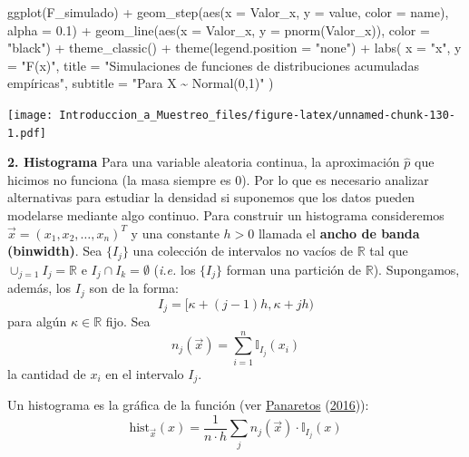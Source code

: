 \documentclass[
]{book}
\newenvironment{Shaded}{\begin{snugshade}}{\end{snugshade}}
\newcommand{\AttributeTok}[1]{\textcolor[rgb]{0.77,0.63,0.00}{#1}}
\newcommand{\FloatTok}[1]{\textcolor[rgb]{0.00,0.00,0.81}{#1}}
\newcommand{\FunctionTok}[1]{\textcolor[rgb]{0.00,0.00,0.00}{#1}}
\newcommand{\NormalTok}[1]{#1}
\newcommand{\SpecialCharTok}[1]{\textcolor[rgb]{0.00,0.00,0.00}{#1}}
\newcommand{\StringTok}[1]{\textcolor[rgb]{0.31,0.60,0.02}{#1}}
\begin{document}
\begin{Shaded}
\begin{Highlighting}[]
\FunctionTok{ggplot}\NormalTok{(F\_simulado) }\SpecialCharTok{+}
  \FunctionTok{geom\_step}\NormalTok{(}\FunctionTok{aes}\NormalTok{(}\AttributeTok{x =}\NormalTok{ Valor\_x, }\AttributeTok{y =}\NormalTok{ value, }\AttributeTok{color =}\NormalTok{ name), }\AttributeTok{alpha =} \FloatTok{0.1}\NormalTok{) }\SpecialCharTok{+}
  \FunctionTok{geom\_line}\NormalTok{(}\FunctionTok{aes}\NormalTok{(}\AttributeTok{x =}\NormalTok{ Valor\_x, }\AttributeTok{y =} \FunctionTok{pnorm}\NormalTok{(Valor\_x)), }\AttributeTok{color =} \StringTok{"black"}\NormalTok{) }\SpecialCharTok{+}
  \FunctionTok{theme\_classic}\NormalTok{() }\SpecialCharTok{+}
  \FunctionTok{theme}\NormalTok{(}\AttributeTok{legend.position =} \StringTok{"none"}\NormalTok{) }\SpecialCharTok{+}
  \FunctionTok{labs}\NormalTok{(}
    \AttributeTok{x =} \StringTok{"x"}\NormalTok{,}
    \AttributeTok{y =} \StringTok{"F(x)"}\NormalTok{,}
    \AttributeTok{title =} \StringTok{"Simulaciones de funciones de distribuciones acumuladas empíricas"}\NormalTok{,}
    \AttributeTok{subtitle =} \StringTok{"Para X \textasciitilde{} Normal(0,1)"}
\NormalTok{  )}
\end{Highlighting}
\end{Shaded}

\texttt{[image: Introduccion\_a\_Muestreo\_files/figure-latex/unnamed-chunk-130-1.pdf]}

\textbf{2. Histograma}
Para una variable aleatoria continua, la aproximación \(\hat{p}\) que hicimos no funciona (la masa siempre es \(0\)). Por lo que es necesario analizar alternativas para estudiar la densidad si suponemos que los datos pueden modelarse mediante algo continuo. Para construir un histograma consideremos \(\vec{x} = (x_1, x_2, \dots, x_n)^T\) y una constante \(h > 0\) llamada el \textbf{ancho de banda (binwidth)}. Sea \(\{ I_j \}\) una colección de intervalos no vacíos de \(\mathbb{R}\) tal que \(\cup_{j=1} I_j = \mathbb{R}\) e \(I_j \cap I_k = \emptyset\) (\emph{i.e.} los \(\{ I_j \}\) forman una partición de \(\mathbb{R}\)). Supongamos, además, los \(I_j\) son de la forma:
\[
I_j = \Big[\kappa + (j-1) h, \kappa + jh  \Big)
\]
para algún \(\kappa \in \mathbb{R}\) fijo. Sea
\[
n_j(\vec{x}) = \sum\limits_{i=1}^n \mathbb{I}_{I_j}(x_i)
\]
la cantidad de \(x_i\) en el intervalo \(I_j\).

Un histograma es la gráfica de la función (ver \protect\hyperlink{ref-panaretos2016statistics}{Panaretos} (\protect\hyperlink{ref-panaretos2016statistics}{2016})):
\[
\text{hist}_{\vec{x}}(x) = \frac{1}{n \cdot h} \sum\limits_{j} n_j(\vec{x}) \cdot \mathbb{I}_{I_j}(x)
\]
\end{document}
